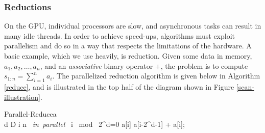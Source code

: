 {\subsubsection{Reductions}
\label{subsec:reduce}
On the GPU, individual processors are slow, and asynchronous tasks can result in many idle threads. In order to achieve speed-ups, algorithms must exploit parallelism and do so in a way that respects the limitations of the hardware. A basic example, which we use heavily, is reduction. Given some data in memory, $a_1, a_2, \ldots, a_n$, and an \textit{associative} binary operator $+$, the problem is to compute $s_{1:n}=\sum_{i=1}^n a_i$. The parallelized reduction algorithm is given below in Algorithm \ref{reduce}, and is illustrated in the top half of the diagram shown in Figure \ref{scan-illustration}.  

\begin{pseudocode}[ruled]{Parallel-Reduce}{a}
\label{reduce}
\\
\FOR d  \TO D \DO \BEGIN
  \FOR i  \TO n \mbox{ \em in parallel }\DO \BEGIN
    \IF i \mbox{ mod } 2^d=0 \DO \BEGIN
    a[i] \GETS a[i-2^{d-1}] + a[i];\\
    \END \END \END
\end{pseudocode}

}
